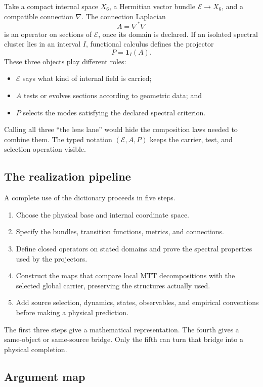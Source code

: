 \documentclass[11pt]{article}
\newcommand{\Ebundle}{\mathcal E}
\begin{document}
Take a compact internal space $X_6$, a Hermitian vector bundle
$\Ebundle\to X_6$, and a compatible connection $\nabla$.  The connection
Laplacian
\[
 A=\nabla^*\nabla
\]
is an operator on sections of $\Ebundle$, once its domain is declared.  If an
isolated spectral cluster lies in an interval $I$, functional calculus defines
the projector
\[
 P=\mathbf 1_I(A).
\]
These three objects play different roles:
\begin{itemize}
\item $\Ebundle$ says what kind of internal field is carried;
\item $A$ tests or evolves sections according to geometric data; and
\item $P$ selects the modes satisfying the declared spectral criterion.
\end{itemize}
Calling all three ``the lens lane'' would hide the composition laws needed to
combine them.  The typed notation $(\Ebundle,A,P)$ keeps the carrier, test, and
selection operation visible.

\subsection{The realization pipeline}

A complete use of the dictionary proceeds in five steps.
\begin{enumerate}
\item Choose the physical base and internal coordinate space.
\item Specify the bundles, transition functions, metrics, and connections.
\item Define closed operators on stated domains and prove the spectral
properties used by the projectors.
\item Construct the maps that compare local MTT decompositions with the
selected global carrier, preserving the structures actually used.
\item Add source selection, dynamics, states, observables, and empirical
conventions before making a physical prediction.
\end{enumerate}
The first three steps give a mathematical representation.  The fourth gives a
same-object or same-source bridge.  Only the fifth can turn that bridge into a
physical completion.

\subsection{Argument map}
\end{document}
